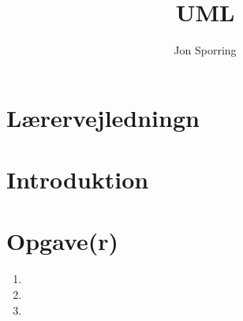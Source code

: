 \documentclass[a4paper,12pt]{article}
\title{UML}
\author{Jon Sporring}
\begin{document}
\maketitle

\section{Lærervejledningn}

\section{Introduktion}

\section{Opgave(r)}
\begin{enumerate}
\item 
\item 
\item 
\end{enumerate}
\end{document}

